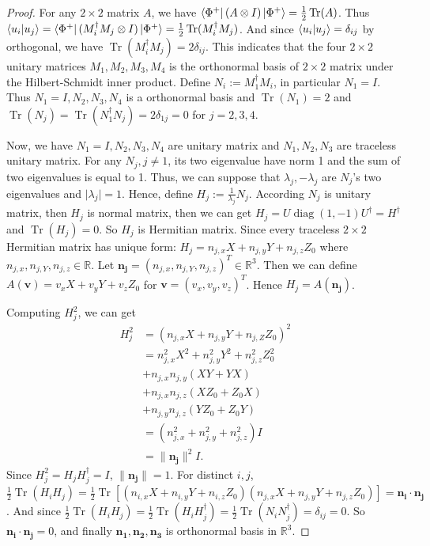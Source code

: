 \begin{proof}
    For any $2\times 2$ matrix $A$, we have $\bra{\Phi^+}(A\otimes I)\ket{\Phi^+}=\frac{1}{2}\operatorname{Tr}(A)$. Thus $\braket{u_i|u_j}=\bra{\Phi^+}(M_i^\dagger M_j\otimes I)\ket{\Phi^+}=\frac{1}{2}\operatorname{Tr}(M_i^\dagger M_j)$. And since $\braket{u_i|u_j}=\delta_{ij}$ by orthogonal, we have $\operatorname{Tr}(M_i^\dagger M_j)=2\delta_{ij}$. This indicates that the four $2\times 2$ unitary matrices $M_1,M_2,M_3,M_4$ is the orthonormal basis of $2\times 2$ matrix under the Hilbert-Schmidt inner product. Define $N_i:=M_1^\dagger M_i$, in particular $N_1=I$. Thus $N_1=I,N_2,N_3,N_4$ is a orthonormal basis and $\operatorname{Tr}(N_1)=2$ and $\operatorname{Tr}(N_j)=\operatorname{Tr}(N_1^\dagger N_j)=2\delta_{1j}=0$ for $j=2,3,4$.

    Now, we have $N_1=I,N_2,N_3,N_4$ are unitary matrix and $N_1,N_2,N_3$ are traceless unitary matrix. For any $N_j,j\neq 1$, its two eigenvalue have norm 1 and the sum of two eigenvalues is equal to 1. Thus, we can suppose that $\lambda_j,-\lambda_j$ are $N_j$'s two eigenvalues and $\lvert \lambda_j\rvert=1$. Hence, define $H_j:=\frac{1}{\lambda_j}N_j$. According $N_j$ is unitary matrix, then $H_j$ is normal matrix, then we can get $H_j=U\operatorname{diag}(1,-1)U^\dagger=H^\dagger$ and $\operatorname{Tr}(H_j)=0$. So $H_j$ is Hermitian matrix. Since every traceless $2\times 2$ Hermitian matrix has unique form: $H_j=n_{j,x}X+n_{j,y}Y+n_{j,z}Z_0$ where $n_{j,x},n_{j,Y},n_{j,z}\in \mathbb{R}$. Let $\mathbf{n_j}=(n_{j,x},n_{j,Y},n_{j,z})^T\in \mathbb{R}^3$. Then we can define $A(\mathbf{v})=v_xX+v_yY+v_zZ_0$ for $\mathbf{v}=(v_x,v_y,v_z)^T$. Hence $H_j=A(\mathbf{n_j})$.

    Computing $H_j^2$, we can get 
    \begin{align*}
        H_j^2&=(n_{j,x}X+n_{j,y}Y+n_{j,Z}Z_0)^2\\
        &=n_{j,x}^2X^2+n_{j,y}^2Y^2+n_{j,z}^2Z_0^2\\
        &+n_{j,x}n_{j,y}(XY+YX)\\
        &+n_{j,x}n_{j,z}(XZ_0+Z_0X)\\
        &+n_{j,y}n_{j,z}(YZ_0+Z_0Y)\\
        &=(n_{j,x}^2+n_{j,y}^2+n_{j,z}^2)I\\
        &=\lVert\mathbf{n_j}\rVert^2I.
    \end{align*}
    Since $H_j^2=H_jH_j^\dagger=I$, $\lVert\mathbf{n_j}\rVert=1$. For distinct $i,j$, $\frac{1}{2}\operatorname{Tr}(H_iH_j)=\frac{1}{2}\operatorname{Tr}[(n_{i,x}X+n_{i,y}Y+n_{i,z}Z_0)(n_{j,x}X+n_{j,y}Y+n_{j,z}Z_0)]=\mathbf{n_i}\cdot\mathbf{n_j}$. And since $\frac{1}{2}\operatorname{Tr}(H_iH_j)=\frac{1}{2}\operatorname{Tr}(H_iH_j^\dagger)=\frac{1}{2}\operatorname{Tr}(N_iN_j^\dagger)=\delta_{ij}=0$. So $\mathbf{n_i}\cdot \mathbf{n_j}=0$, and finally $\mathbf{n_1},\mathbf{n_2},\mathbf{n_3}$ is orthonormal basis in $\mathbb{R}^3$. 


\end{proof}
